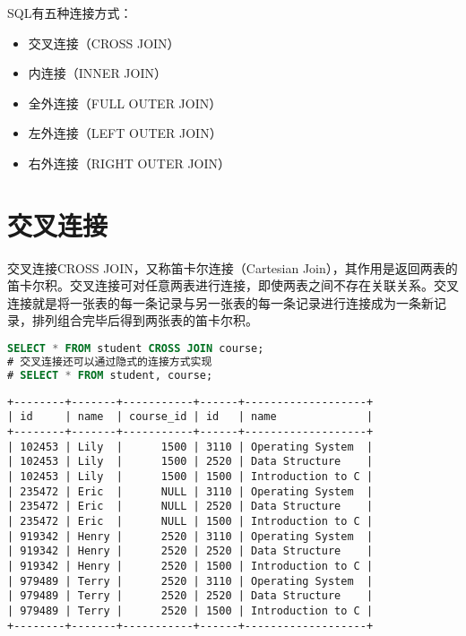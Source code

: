 \documentclass[12pt, openany, oneside]{book}
\begin{document}
SQL有五种连接方式：

\begin{itemize}
	\item 交叉连接（CROSS JOIN）
	\item 内连接（INNER JOIN）
	\item 全外连接（FULL OUTER JOIN）
	\item 左外连接（LEFT OUTER JOIN）
	\item 右外连接（RIGHT OUTER JOIN）
\end{itemize}

\vspace{0.5cm}

\section{交叉连接}

交叉连接CROSS JOIN，又称笛卡尔连接（Cartesian Join），其作用是返回两表的笛卡尔积。交叉连接可对任意两表进行连接，即使两表之间不存在关联关系。交叉连接就是将一张表的每一条记录与另一张表的每一条记录进行连接成为一条新记录，排列组合完毕后得到两张表的笛卡尔积。\\


\begin{lstlisting}[language=SQL]
SELECT * FROM student CROSS JOIN course;
# 交叉连接还可以通过隐式的连接方式实现
# SELECT * FROM student, course;
\end{lstlisting}

\begin{tcolorbox}
	\begin{verbatim}
+--------+-------+-----------+------+-------------------+
| id     | name  | course_id | id   | name              |
+--------+-------+-----------+------+-------------------+
| 102453 | Lily  |      1500 | 3110 | Operating System  |
| 102453 | Lily  |      1500 | 2520 | Data Structure    |
| 102453 | Lily  |      1500 | 1500 | Introduction to C |
| 235472 | Eric  |      NULL | 3110 | Operating System  |
| 235472 | Eric  |      NULL | 2520 | Data Structure    |
| 235472 | Eric  |      NULL | 1500 | Introduction to C |
| 919342 | Henry |      2520 | 3110 | Operating System  |
| 919342 | Henry |      2520 | 2520 | Data Structure    |
| 919342 | Henry |      2520 | 1500 | Introduction to C |
| 979489 | Terry |      2520 | 3110 | Operating System  |
| 979489 | Terry |      2520 | 2520 | Data Structure    |
| 979489 | Terry |      2520 | 1500 | Introduction to C |
+--------+-------+-----------+------+-------------------+
	\end{verbatim}
\end{tcolorbox}
\end{document}
